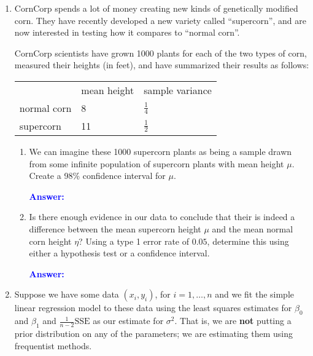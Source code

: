 \documentclass[12pt]{article}
\newcommand{\ansfont}[1]{{\textcolor{blue}{\textbf{Answer:}}\ \ #1}}
\begin{document}
\begin{enumerate}
\begin{enumerate}
\ansfont{
}
\vfill
\end{enumerate}





\newpage %
\item CornCorp spends a lot of money creating new kinds of genetically modified corn. They have recently developed a new variety called ``supercorn'', and are now interested in testing how it compares to ``normal corn''.

CornCorp scientists have grown 1000 plants for each of the two types of corn, measured their heights (in feet), and have summarized their results as follows:
\begin{table}[h]
  \centering
  \begin{tabular}{lll}
    & mean height & sample variance \\
    normal corn & 8 & $\frac{1}{4}$ \\
    supercorn & 11 & $\frac{1}{2}$ \\
  \end{tabular}
\end{table}

\begin{enumerate}
\item We can imagine these 1000 supercorn plants as being a sample drawn from some infinite population of supercorn plants with mean height $\mu$. Create a 98\% confidence interval for $\mu$.



\ansfont{
}
\vfill

\item Is there enough evidence in our data to conclude that their is indeed a difference between the mean supercorn height $\mu$ and the mean normal corn height $\eta$? Using a type 1 error rate of $0.05$, determine this using either a hypothesis test or a confidence interval.



\ansfont{
}
\vfill
\end{enumerate}





\newpage %
\item Suppose we have some data $(x_i, y_i)$, for $i = 1, \ldots, n$ and we fit the simple linear regression model to these data using the least squares estimates for $\beta_0$ and $\beta_1$ and $\frac{1}{n - 2} \text{SSE}$ as our estimate for $\sigma^2$. That is, we are \textbf{not} putting a prior distribution on any of the parameters; we are estimating them using frequentist methods.


\end{enumerate}
\end{document}
